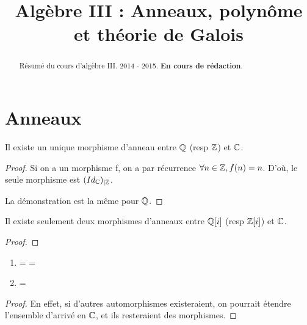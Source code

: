 \documentclass[a4paper, 12pt]{article}
\title{Algèbre III : Anneaux, polynôme et théorie de Galois}
\begin{document}
\maketitle

\begin{abstract}
	Résumé du cours d'algèbre III. 2014 - 2015. \textbf{En cours de rédaction}.
\end{abstract}

\section{Anneaux}

\begin{proposition}
	Il existe un unique morphisme d'anneau entre $\mathbb{Q}$ (resp $\mathbb{Z}$)
	et $\mathbb{C}$.
\end{proposition}

\begin{proof}
	Si on a un morphisme f, on a par récurrence $\forall n \in \mathbb{Z}, f(n) =
	n$. D'où, le seule morphisme est $({Id_{\mathbb{C}}})_{|\mathbb{Z}}$.

	La démonstration est la même pour $\mathbb{Q}$.
\end{proof}

\begin{proposition}
	Il existe seulement deux morphismes d'anneaux entre $\mathbb{Q}[i]$ (resp
	$\mathbb{Z}[i]$) et $\mathbb{C}$.
\end{proposition}

\begin{proof}
\end{proof}

\begin{corollary}
	\begin{enumerate}
		\item {} =
			 = 
		\item {} = 
	\end{enumerate}
	\begin{proof}
	En effet, si d'autres automorphismes existeraient, on pourrait étendre
	l'ensemble d'arrivé en $\mathbb{C}$, et ils resteraient des morphismes.
	\end{proof}
\end{corollary}
\end{document}
